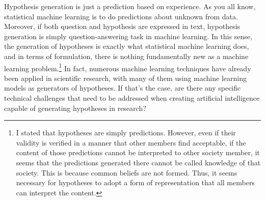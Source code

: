 Hypothesis generation is just a prediction based on experience. As you all know, statistical machine learning is to do predictions about unknown from data. Moreover, if both question and hypothesis are expressed in text, hypothesis generation is simply question-answering task in machine learning. In this sense, the generation of hypotheses is exactly what statistical machine learning does, and in terms of formulation, there is nothing fundamentally new as a machine learning problem.\footnote{
I stated that hypotheses are simply predictions. However, even if their validity is verified in a manner that other members find acceptable, if the content of those predictions cannot be interpreted to other society member, it seems that the predictions generated there cannot be called knowledge of that society. This is because common beliefs are not formed. Thus, it seems necessary for hypotheses to adopt a form of representation that all members can interpret the content.
} In fact, numerous machine learning techniques have already been applied in scientific research, with many of them using machine learning models as generators of hypotheses. If that's the case, are there any specific technical challenges that need to be addressed when creating artificial intelligence capable of generating hypotheses in research? 




